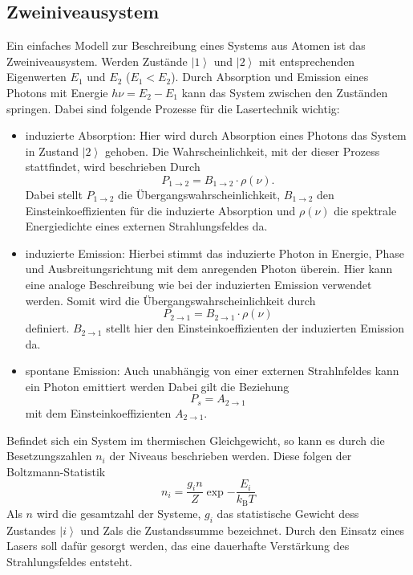 \subsection{Zweiniveausystem}
Ein einfaches Modell zur Beschreibung eines Systems aus Atomen ist das Zweiniveausystem.
Werden Zustände $\left| 1 \right>$ und $\left| 2 \right>$ mit entsprechenden
Eigenwerten $E_1$ und $E_2$ ($E_1<E_2$). Durch Absorption und Emission eines Photons mit
Energie $h\nu=E_2-E_1$ kann das System zwischen den Zuständen springen. Dabei sind
folgende Prozesse für die Lasertechnik wichtig:
\begin{itemize}
  \item induzierte Absorption:
  Hier wird durch Absorption eines Photons das System in Zustand $\left| 2 \right>$
  gehoben. Die Wahrscheinlichkeit, mit der dieser Prozess stattfindet, wird beschrieben
  Durch
  \begin{equation}
    P_{1\rightarrow 2} = B_{1\rightarrow 2}\cdot \rho(\nu).
  \end{equation}
  Dabei stellt $P_{1\rightarrow 2}$ die Übergangswahrscheinlichkeit, $B_{1\rightarrow 2}$ den
  Einsteinkoeffizienten für die induzierte Absorption und $\rho(\nu)$ die spektrale Energiedichte
  eines externen Strahlungsfeldes da.
  \item induzierte Emission:
  Hierbei stimmt das induzierte Photon in Energie, Phase und Ausbreitungsrichtung
  mit dem anregenden Photon überein. Hier kann eine analoge Beschreibung wie bei der
  induzierten Emission verwendet werden. Somit wird die Übergangswahrscheinlichkeit durch
  \begin{equation}
    P_{2\rightarrow 1} = B_{2\rightarrow 1}\cdot\rho(\nu)
  \end{equation}
  definiert. $B_{2\rightarrow 1}$ stellt hier den Einsteinkoeffizienten der induzierten
  Emission da.
  \item spontane Emission:
  Auch unabhängig von einer externen Strahlnfeldes kann ein Photon emittiert werden
  Dabei gilt die Beziehung
  \begin{equation}
    P_s = A_{2\rightarrow 1}
  \end{equation}
  mit dem Einsteinkoeffizienten $A_{2\rightarrow 1}$.
\end{itemize}

Befindet sich ein System im thermischen Gleichgewicht, so kann es durch die
Besetzungszahlen $n_i$ der Niveaus beschrieben werden. Diese folgen der Boltzmann-Statistik
\begin{equation}
    n_i = \frac{g_in}{Z}\exp{-\frac{E_i}{k_\text{B}T}}
\end{equation}
Als $n$ wird die gesamtzahl der Systeme, $g_i$ das statistische Gewicht dess Zustandes
$\left| i \right>$ und Zals die Zustandssumme bezeichnet. Durch den Einsatz
eines Lasers soll dafür gesorgt werden, das eine dauerhafte Verstärkung des
Strahlungsfeldes entsteht.

